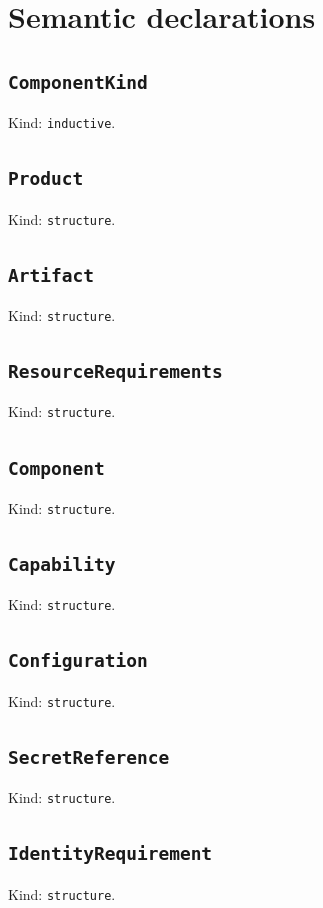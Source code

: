 \documentclass[11pt]{article}
\begin{document}
\section*{Semantic declarations}
\subsection*{\texttt{ComponentKind}}
\noindent Kind: \texttt{inductive}.\par
\subsection*{\texttt{Product}}
\noindent Kind: \texttt{structure}.\par
\subsection*{\texttt{Artifact}}
\noindent Kind: \texttt{structure}.\par
\subsection*{\texttt{ResourceRequirements}}
\noindent Kind: \texttt{structure}.\par
\subsection*{\texttt{Component}}
\noindent Kind: \texttt{structure}.\par
\subsection*{\texttt{Capability}}
\noindent Kind: \texttt{structure}.\par
\subsection*{\texttt{Configuration}}
\noindent Kind: \texttt{structure}.\par
\subsection*{\texttt{SecretReference}}
\noindent Kind: \texttt{structure}.\par
\subsection*{\texttt{IdentityRequirement}}
\noindent Kind: \texttt{structure}.\par
\end{document}
